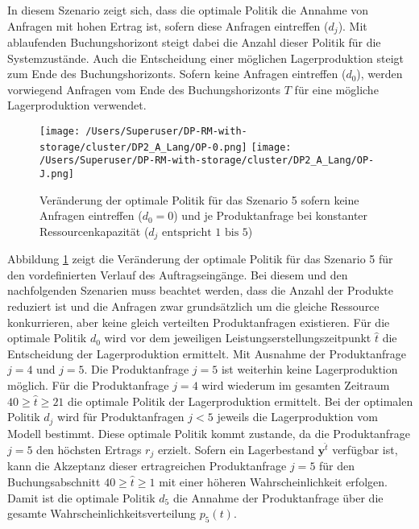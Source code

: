 In diesem Szenario zeigt sich, dass die optimale Politik die Annahme von Anfragen mit hohen Ertrag ist, sofern diese Anfragen eintreffen ($d_j$). Mit ablaufenden Buchungshorizont steigt dabei die Anzahl dieser Politik für die Systemzustände. Auch die Entscheidung einer möglichen Lagerproduktion steigt zum Ende des Buchungshorizonts. Sofern keine Anfragen eintreffen ($d_0$), werden vorwiegend Anfragen vom Ende des Buchungshorizonts $T$ für eine mögliche Lagerproduktion verwendet.

\begin{figure}[h!]     
\begin{center}
\texttt{[image: /Users/Superuser/DP-RM-with-storage/cluster/DP2\_A\_Lang/OP-0.png]}
\texttt{[image: /Users/Superuser/DP-RM-with-storage/cluster/DP2\_A\_Lang/OP-J.png]}
    \caption{Veränderung der optimale Politik für das Szenario 5 sofern keine Anfragen eintreffen ($d_0=0$) und je Produktanfrage bei konstanter Ressourcenkapazität ($d_j\text{ entspricht }1\text{ bis }5$)}  \label{SV5}
  \end{center}
\end{figure}

Abbildung \ref{SV5} zeigt die Veränderung der optimale Politik für das Szenario 5 für den vordefinierten Verlauf des Auftragseingänge. Bei diesem und den nachfolgenden Szenarien muss beachtet werden, dass die Anzahl der Produkte reduziert ist und die Anfragen zwar grundsätzlich um die gleiche Ressource konkurrieren, aber keine gleich verteilten Produktanfragen existieren. Für die optimale Politik $d_0$ wird vor dem jeweiligen Leistungserstellungszeitpunkt $\hat t$ die Entscheidung der Lagerproduktion ermittelt. Mit Ausnahme der Produktanfrage $j=4$ und $j=5$. Die Produktanfrage $j=5$ ist weiterhin keine Lagerproduktion möglich. Für die Produktanfrage $j=4$ wird wiederum im gesamten Zeitraum $40\ge\hat t\ge 21$ die optimale Politik der Lagerproduktion ermittelt. Bei der optimalen Politik $d_j$ wird für Produktanfragen $j<5$ jeweils die Lagerproduktion vom Modell bestimmt. Diese optimale Politik kommt zustande, da die Produktanfrage $j=5$ den höchsten Ertrags $r_j$ erzielt. Sofern ein Lagerbestand $\textbf{y}^{\hat t}$ verfügbar ist, kann die Akzeptanz dieser ertragreichen Produktanfrage $j=5$ für den Buchungsabschnitt $40\ge\hat t\ge1$ mit einer höheren Wahrscheinlichkeit erfolgen. Damit ist die optimale Politik $d_5$ die Annahme der Produktanfrage über die gesamte Wahrscheinlichkeitsverteilung $p_5(t)$.

